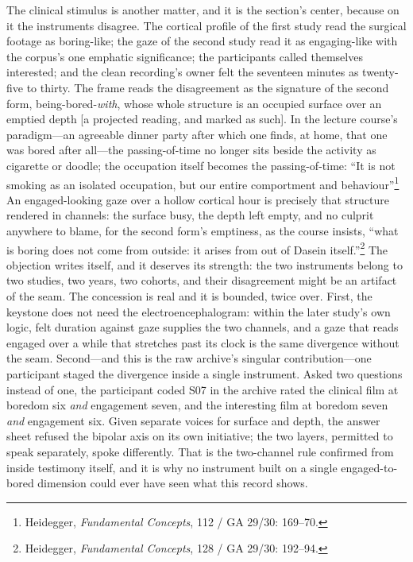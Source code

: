 \documentclass{article}
\begin{document}
The clinical stimulus is another matter, and it is the section's center, because on it the instruments disagree. The cortical profile of the first study read the surgical footage as boring-like; the gaze of the second study read it as engaging-like with the corpus's one emphatic significance; the participants called themselves interested; and the clean recording's owner felt the seventeen minutes as twenty-five to thirty. The frame reads the disagreement as the signature of the second form, being-bored-\textit{with}, whose whole structure is an occupied surface over an emptied depth [a projected reading, and marked as such]. In the lecture course's paradigm---an agreeable dinner party after which one finds, at home, that one was bored after all---the passing-of-time no longer sits beside the activity as cigarette or doodle; the occupation itself becomes the passing-of-time: ``It is not smoking as an isolated occupation, but our entire comportment and behaviour''\footnote{Heidegger, \textit{Fundamental Concepts}, 112 / GA 29/30: 169--70.} An engaged-looking gaze over a hollow cortical hour is precisely that structure rendered in channels: the surface busy, the depth left empty, and no culprit anywhere to blame, for the second form's emptiness, as the course insists, ``what is boring does not come from outside: it arises from out of Dasein itself.''\footnote{Heidegger, \textit{Fundamental Concepts}, 128 / GA 29/30: 192--94.} The objection writes itself, and it deserves its strength: the two instruments belong to two studies, two years, two cohorts, and their disagreement might be an artifact of the seam. The concession is real and it is bounded, twice over. First, the keystone does not need the electroencephalogram: within the later study's own logic, felt duration against gaze supplies the two channels, and a gaze that reads engaged over a while that stretches past its clock is the same divergence without the seam. Second---and this is the raw archive's singular contribution---one participant staged the divergence inside a single instrument. Asked two questions instead of one, the participant coded S07 in the archive rated the clinical film at boredom six \textit{and} engagement seven, and the interesting film at boredom seven \textit{and} engagement six. Given separate voices for surface and depth, the answer sheet refused the bipolar axis on its own initiative; the two layers, permitted to speak separately, spoke differently. That is the two-channel rule confirmed from inside testimony itself, and it is why no instrument built on a single engaged-to-bored dimension could ever have seen what this record shows.
\end{document}

